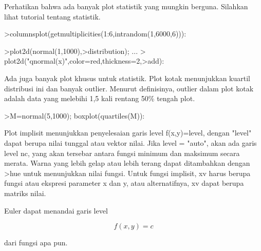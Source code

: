\documentclass{article}
\begin{document}
\begin{eulernotebook}
\begin{eulercomment}
\begin{eulercomment}
\begin{eulercomment}
\begin{eulercomment}
\begin{eulercomment}
Perhatikan bahwa ada banyak plot statistik yang mungkin berguna.
Silahkan lihat tutorial tentang statistik.
\end{eulercomment}
\begin{eulerprompt}
>columnsplot(getmultiplicities(1:6,intrandom(1,6000,6))):
\end{eulerprompt}
\begin{eulerprompt}
>plot2d(normal(1,1000),>distribution); ...
>  plot2d("qnormal(x)",color=red,thickness=2,>add):
\end{eulerprompt}
\begin{eulercomment}
Ada juga banyak plot khusus untuk statistik. Plot kotak menunjukkan
kuartil distribusi ini dan banyak outlier. Menurut definisinya,
outlier dalam plot kotak adalah data yang melebihi 1,5 kali rentang
50\% tengah plot.
\end{eulercomment}
\begin{eulerprompt}
>M=normal(5,1000); boxplot(quartiles(M)):
\end{eulerprompt}
\begin{eulercomment}
Plot implisit menunjukkan penyelesaian garis level f(x,y)=level,
dengan "level" dapat berupa nilai tunggal atau vektor nilai. Jika
level = "auto", akan ada garis level nc, yang akan tersebar antara
fungsi minimum dan maksimum secara merata. Warna yang lebih gelap atau
lebih terang dapat ditambahkan dengan \textgreater{}hue untuk menunjukkan nilai
fungsi. Untuk fungsi implisit, xv harus berupa fungsi atau ekspresi
parameter x dan y, atau alternatifnya, xv dapat berupa matriks nilai.

Euler dapat menandai garis level

\end{eulercomment}
\begin{eulerformula}
\[
f(x,y) = c
\]
\end{eulerformula}
\begin{eulercomment}
dari fungsi apa pun.



\end{eulercomment}
\end{eulercomment}
\end{eulercomment}
\end{eulercomment}
\end{eulercomment}
\end{eulernotebook}
\end{document}
